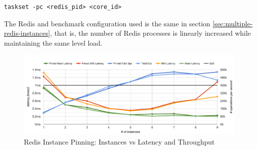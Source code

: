 \begin{lstlisting}
taskset -pc <redis_pid> <core_id>
\end{lstlisting}

The Redis and benchmark configuration used is the same in section \ref{sec:multiple-redis-instances}, that is, the number of Redis processes is linearly increased while maintaining the same level load.

\begin{figure}[h]
    \includegraphics[width=\textwidth]{./res/6_pinned.png}
    \caption{Redis Instance Pinning: Instances vs Latency and Throughput}
    \label{fig:6_pinned.png}
\end{figure}